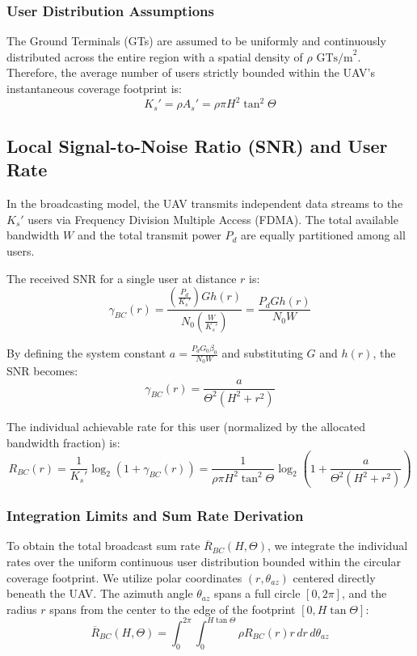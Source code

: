\documentclass[11pt,a4paper]{article}
\begin{document}
        \subsubsection{User Distribution Assumptions}
        The Ground Terminals (GTs) are assumed to be uniformly and continuously distributed across the entire region with a spatial density of $\rho \text{ GTs/m}^2$.
        Therefore, the average number of users strictly bounded within the UAV's instantaneous coverage footprint is:
        $$K_s' = \rho A_s' = \rho \pi H^2 \tan^2\Theta$$

    \subsection{Local Signal-to-Noise Ratio (SNR) and User Rate}
    In the broadcasting model, the UAV transmits independent data streams to the $K_s'$ users via Frequency Division Multiple Access (FDMA).
    The total available bandwidth $W$ and the total transmit power $P_d$ are equally partitioned among all users.

    The received SNR for a single user at distance $r$ is:
    $$\gamma_{BC}(r) = \frac{\left(\frac{P_d}{K_s'}\right) G h(r)}{N_0 \left(\frac{W}{K_s'}\right)} = \frac{P_d G h(r)}{N_0 W}$$

    By defining the system constant $a = \frac{P_d G_0 \beta_0}{N_0 W}$ and substituting $G$ and $h(r)$, the SNR becomes:
    $$\gamma_{BC}(r) = \frac{a}{\Theta^2(H^2 + r^2)}$$

    The individual achievable rate for this user (normalized by the allocated bandwidth fraction) is:
    $$R_{BC}(r) = \frac{1}{K_s'} \log_2(1 + \gamma_{BC}(r)) = \frac{1}{\rho \pi H^2 \tan^2\Theta} \log_2\left(1 + \frac{a}{\Theta^2(H^2 + r^2)}\right)$$

        \subsubsection{Integration Limits and Sum Rate Derivation}
        To obtain the total broadcast sum rate $\overline{R}_{BC}(H, \Theta)$, we integrate the individual rates over the uniform continuous user distribution bounded within the circular coverage footprint.
        We utilize polar coordinates $(r, \theta_{az})$ centered directly beneath the UAV. The azimuth angle $\theta_{az}$ spans a full circle $[0, 2\pi]$, and the
        radius $r$ spans from the center to the edge of the footprint $[0, H \tan\Theta]$:
        $$\overline{R}_{BC}(H, \Theta) = \int_{0}^{2\pi} \int_{0}^{H \tan\Theta} \rho R_{BC}(r) r \, dr \, d\theta_{az}$$
\end{document}
